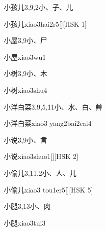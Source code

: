 \begin{entry}{小孩儿}{3,9,2}{⼩、⼦、⼉}
  \begin{phonetics}{小孩儿}{xiao3hai2r5}[][HSK 1]
  \end{phonetics}
\end{entry}

\begin{entry}{小屋}{3,9}{⼩、⼫}
  \begin{phonetics}{小屋}{xiao3wu1}
  \end{phonetics}
\end{entry}

\begin{entry}{小树}{3,9}{⼩、⽊}
  \begin{phonetics}{小树}{xiao3shu4}
  \end{phonetics}
\end{entry}

\begin{entry}{小洋白菜}{3,9,5,11}{⼩、⽔、⽩、⾋}
  \begin{phonetics}{小洋白菜}{xiao3 yang2bai2cai4}
  \end{phonetics}
\end{entry}

\begin{entry}{小说}{3,9}{⼩、⾔}
  \begin{phonetics}{小说}{xiao3shuo1}[][HSK 2]
  \end{phonetics}
\end{entry}

\begin{entry}{小偷儿}{3,11,2}{⼩、⼈、⼉}
  \begin{phonetics}{小偷儿}{xiao3 tou1er5}[][HSK 5]
  \end{phonetics}
\end{entry}

\begin{entry}{小腿}{3,13}{⼩、⾁}
  \begin{phonetics}{小腿}{xiao3tui3}
  \end{phonetics}
\end{entry}

